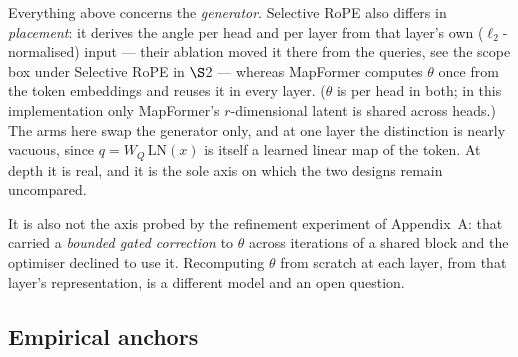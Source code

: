 \documentclass[11pt]{article}
\begin{document}
Everything above concerns the \emph{generator}. Selective RoPE also differs in
\emph{placement}: it derives the angle per head and per layer from that layer's own
($\ell_2$-normalised) input --- their ablation moved it there from the queries, see
the scope box under Selective RoPE in $\S$2 --- whereas MapFormer computes $\theta$ once from the token
embeddings and reuses it in every layer. ($\theta$ is per head in both; in this
implementation only MapFormer's $r$-dimensional latent is shared across heads.) The arms here swap the generator only, and
at one layer the distinction is nearly vacuous, since $q = W_Q\,\mathrm{LN}(x)$ is
itself a learned linear map of the token. At depth it is real, and it is the sole
axis on which the two designs remain uncompared.

It is also not the axis probed by the refinement experiment of Appendix~A: that
carried a \emph{bounded gated correction} to $\theta$ across iterations of a shared
block and the optimiser declined to use it. Recomputing $\theta$ from scratch at
each layer, from that layer's representation, is a different model and an open
question.

\subsection{Empirical anchors}
\end{document}
